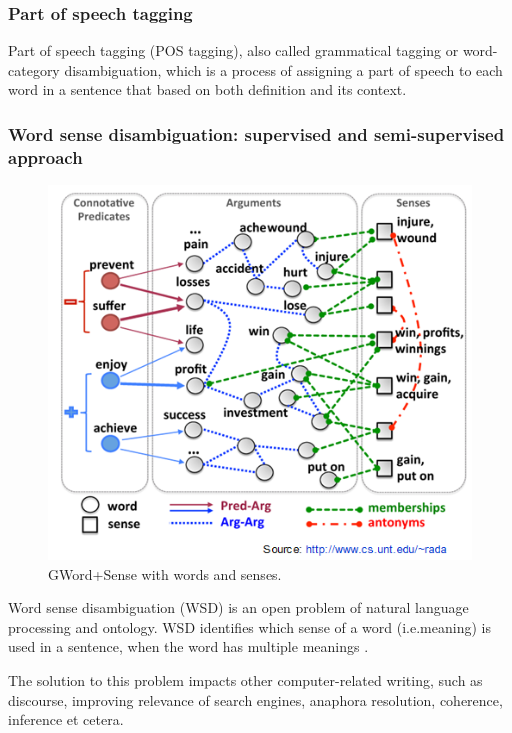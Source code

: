 \subsubsection*{Part of speech tagging}

Part of speech tagging (POS tagging), also called grammatical tagging or word-category disambiguation, which is a process of assigning a part of speech to each word in a sentence that based on both definition and its context.\\
 
\subsubsection*{Word sense disambiguation: supervised and semi-supervised approach}

\begin{figure}[tbh]
	\begin{center}
		\includegraphics[width=\columnwidth]{Union_Background_Chart_WSD}
	\end{center}
	\caption{GWord+Sense with words and senses. \label{fig1}}
\end{figure}

Word sense disambiguation (WSD) is an open problem of natural language processing and ontology. 
WSD identifies which sense of a word (i.e.meaning) is used in a sentence,
when the word has multiple meanings \cite{Du2013}. 

The solution to this problem impacts other computer-related writing, such as discourse, 
improving relevance of search engines, anaphora resolution, coherence, inference et cetera.

